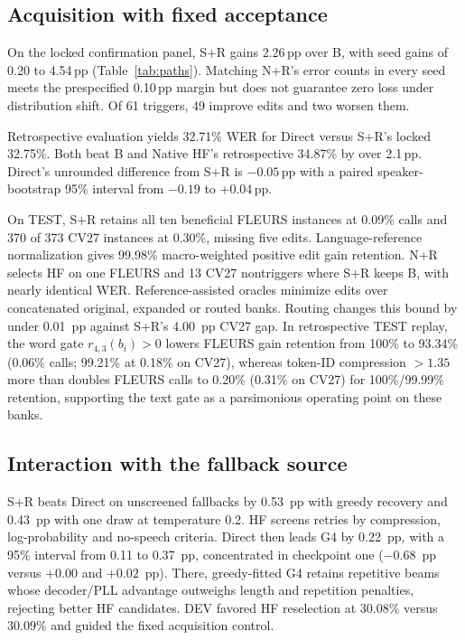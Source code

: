 \subsection{Acquisition with fixed acceptance}
On the locked confirmation panel, S+R gains 2.26\,pp over B, with seed gains of 0.20 to 4.54\,pp (Table~\ref{tab:paths}). Matching N+R's error counts in every seed meets the prespecified 0.10\,pp margin but does not guarantee zero loss under distribution shift. Of 61 triggers, 49 improve edits and two worsen them.

Retrospective evaluation yields 32.71\% WER for Direct versus S+R's locked 32.75\%. Both beat B and Native HF's retrospective 34.87\% by over 2.1\,pp. Direct's unrounded difference from S+R is $-0.05$\,pp with a paired speaker-bootstrap 95\% interval from $-0.19$ to $+0.04$\,pp.

On TEST, S+R retains all ten beneficial FLEURS instances at 0.09\% calls and 370 of 373 CV27 instances at 0.30\%, missing five edits. Language-reference normalization gives 99.98\% macro-weighted positive edit gain retention. N+R selects HF on one FLEURS and 13 CV27 nontriggers where S+R keeps B, with nearly identical WER. Reference-assisted oracles minimize edits over concatenated original, expanded or routed banks. Routing changes this bound by under 0.01~pp against S+R's 4.00~pp CV27 gap. In retrospective TEST replay, the word gate $r_{4,3}(b_i) > 0$ lowers FLEURS gain retention from 100\% to 93.34\% (0.06\% calls; 99.21\% at 0.18\% on CV27), whereas token-ID compression $> 1.35$ more than doubles FLEURS calls to 0.20\% (0.31\% on CV27) for 100\%/99.99\% retention, supporting the text gate as a parsimonious operating point on these banks.

\subsection{Interaction with the fallback source}
S+R beats Direct on unscreened fallbacks by 0.53~pp with greedy recovery and 0.43~pp with one draw at temperature 0.2. HF screens retries by compression, log-probability and no-speech criteria. Direct then leads G4 by 0.22~pp, with a 95\% interval from 0.11 to 0.37~pp, concentrated in checkpoint one ($-0.68$~pp versus $+0.00$ and $+0.02$~pp). There, greedy-fitted G4 retains repetitive beams whose decoder/PLL advantage outweighs length and repetition penalties, rejecting better HF candidates. DEV favored HF reselection at 30.08\% versus 30.09\% and guided the fixed acquisition control.

